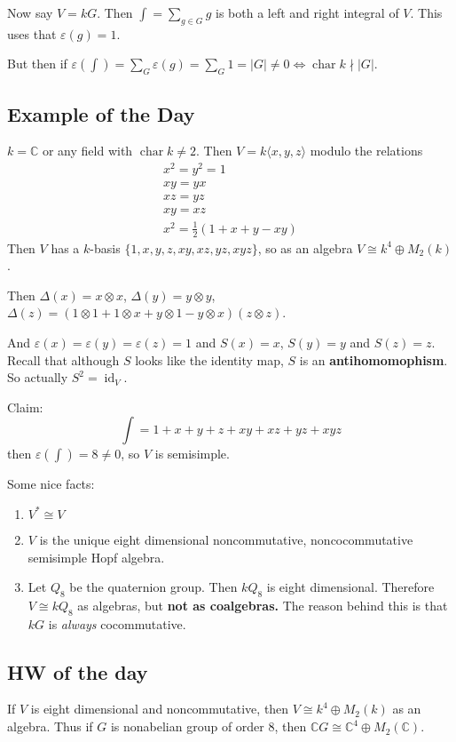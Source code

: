 \documentclass[12pt]{article}
\theoremstyle{break}
\theoremstyle{nonumberbreak}
\theoremstyle{changebreak}
\theoremstyle{break}
\theoremstyle{nonumberbreak}
\theoremstyle{nonumberplain}
\theoremstyle{change}
\newcommand*{\C}{
\mathbb{C}
}
\DeclareMathOperator{\ch}{char}
\DeclareMathOperator{\id}{id}
\begin{document}
Now say $V=kG$. Then $\int=\sum_{g\in G} g$ is both a left and right integral of $V$. This uses that $\varepsilon(g)=1$.

But then if $\varepsilon(\int)=\sum_G \varepsilon(g)=\sum_G 1=|G|\ne 0\Leftrightarrow \ch k\nmid |G|$.

\subsection{Example of the Day}
\begin{ex}
	$k=\C$ or any field with $\ch k\ne 2$. Then $V=k\langle x,y,z\rangle$ modulo the relations
	\begin{align*}
		x^2=y^2=1\\
		xy=yx\\
		xz=yz\\
		xy=xz\\
		x^2=\frac{1}{2}(1+x+y-xy)
	\end{align*}
	Then $V$ has a $k$-basis $\{1,x,y,z,xy,xz,yz,xyz\}$, so as an algebra $V\cong k^4\oplus M_2(k)$.

	Then $\Delta(x)=x\otimes x$, $\Delta(y)=y\otimes y$, $\Delta(z)=(1\otimes 1+1\otimes x+y\otimes 1-y\otimes x)(z\otimes z)$.

	And $\varepsilon(x)=\varepsilon(y)=\varepsilon(z)=1$ and $S(x)=x$, $S(y)=y$ and $S(z)=z$. Recall that although $S$ looks like the identity map, 
	$S$ is an \textbf{antihomomophism}. So actually $S^2=\id_V$.

	Claim:
	\[\int=1+x+y+z+xy+xz+yz+xyz\]
	then $\varepsilon(\int)=8\ne 0$, so $V$ is semisimple.

	Some nice facts:
	\begin{enumerate}
		\item $V^*\cong V$
		\item $V$ is the unique eight dimensional noncommutative, noncocommutative semisimple Hopf algebra.
		\item Let $Q_8$ be the quaternion group. Then $kQ_8$ is eight dimensional. Therefore $V\cong kQ_8$ as algebras, but \textbf{not as coalgebras.}
		The reason behind this is that $kG$ is \textit{always} cocommutative.
	\end{enumerate}
\end{ex}

\subsection{HW of the day}
\begin{prob}
	If $V$ is eight dimensional and noncommutative, then $V\cong k^4\oplus M_2(k)$ as an algebra. Thus if $G$ is nonabelian group of order 8, then $\C G\cong \C^4\oplus M_2(\C)$.
\end{prob}
\end{document}
